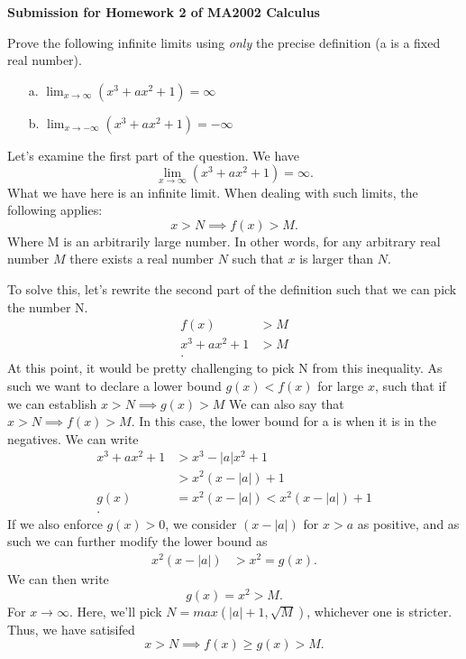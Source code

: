 \documentclass[a4paper]{article}
\begin{document}
\noindent \textbf{Submission for Homework 2 of MA2002 Calculus} \newline

\begin{tcolorbox}[title=Question 1]
	Prove the following infinite limits using \textit{only} the precise definition (a is a fixed real number).
	\begin{itemize}
		\item [a.] $\lim_{x \to \infty} (x^3 + ax^2 + 1) = \infty$
		\item[b.] $\lim_{x \to -\infty} \left(x^3 + ax^2 + 1\right) = -\infty $ 
	\end{itemize}
\end{tcolorbox}	
\vspace{5pt}
\noindent Let's examine the first part of the question. We have \[
\lim_{x \to \infty} (x^3 + ax^2 + 1) = \infty
.\]  What we have here is an infinite limit. When dealing with such limits, the following applies: \[
x > N \implies f(x) > M
.\]  Where M is an arbitrarily large number. In other words, for any arbitrary real number $M$ there exists a real number $N$ such that $x$ is larger than $N$.  

To solve this, let's rewrite the second part of the definition such that we can pick the number N.
\begin{align*}
	f(x) &> M \\
	x^3 + ax^2 + 1 &> M \\
.\end{align*} 
At this point, it would be pretty challenging to pick N from this inequality. As such we want to declare a lower bound $g(x) < f(x)$ for large $x$, such that if we can establish $x >N \implies g(x) > M$ We can also say that $x > N \implies f(x) > M$. In this case, the lower bound for a is when it is in the negatives. We can write
\begin{align*}
	x^3 + ax^2 + 1 &> x^3 -|a|x^2 + 1 \\
		       &> x^2(x - |a|) + 1 \\
		  g(x) &= x^2(x - |a|) < x^2(x - |a|) + 1 \\ 
.\end{align*}
If we also enforce $g(x) > 0$, we consider $(x - |a|)$ for $x > a$ as positive, and as such we can further modify the lower bound as
 \begin{align*}
	 x^2(x - |a|) &> x^2 = g(x).
 \end{align*}
 We can then write \[
 g(x) = x^2 > M
 .\] For $x \to  \infty$. Here, we'll pick $N = max(|a| + 1, \sqrt{M}) $, whichever one is stricter. Thus, we have satisifed \[
 x > N \implies f(x) \ge  g(x) > M
 .\] 
 
\end{document}
